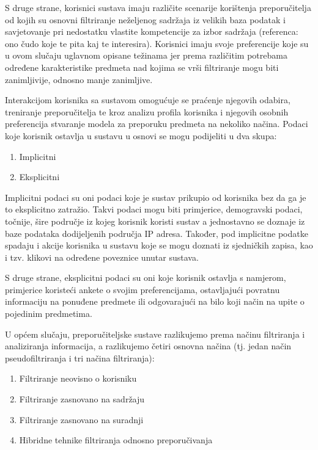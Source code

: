 \documentclass[times, utf8, diplomski, numeric]{fer}
\begin{document}
S druge strane, korisnici sustava imaju različite scenarije korištenja
preporučitelja od kojih su osnovni filtriranje neželjenog sadržaja iz velikih
baza podatak i savjetovanje pri nedostatku vlastite kompetencije za izbor
sadržaja (referenca: ono čudo koje te pita kaj te interesira). Korisnici imaju
svoje preferencije koje su u ovom slučaju uglavnom opisane težinama jer prema
različitim potrebama određene karakteristike predmeta nad kojima se vrši
filtriranje mogu biti zanimljivije, odnosno manje zanimljive.

Interakcijom korisnika sa sustavom omogućuje se praćenje njegovih odabira,
treniranje preporučitelja te kroz analizu profila korisnika i njegovih osobnih
preferencija stvaranje modela za preporuku predmeta na nekoliko načina. Podaci
koje korisnik ostavlja u sustavu u osnovi se mogu podijeliti u dva skupa:
\begin{enumerate}
  \item Implicitni
  \item Eksplicitni
\end{enumerate}
Implicitni podaci su oni podaci koje je sustav prikupio od korisnika bez da ga
je to eksplicitno zatražio. Takvi podaci mogu biti primjerice, demogravski
podaci, točnije, šire područje iz kojeg korisnik koristi sustav a jednostavno se
doznaje iz baze podataka dodijeljenih područja  IP adresa.
Također, pod implicitne podatke spadaju i akcije korisnika u sustavu koje se
mogu doznati iz sjedničkih zapisa, kao i tzv. klikovi na određene poveznice
unutar sustava.

S druge strane, eksplicitni podaci su oni koje korisnik ostavlja s namjerom,
primjerice koristeći ankete o svojim preferencijama, ostavljajući povratnu
informaciju na ponuđene predmete  ili odgovarajući na bilo
koji način na upite o pojedinim predmetima.

U općem slučaju, preporučiteljske sustave razlikujemo prema načinu filtriranja i
analiziranja informacija, a razlikujemo četiri osnovna načina (tj. jedan način
pseudofiltriranja i tri načina filtriranja):
\begin{enumerate}
  \item Filtriranje neovisno o korisniku 
  \item Filtriranje zasnovano na sadržaju 
  \item Filtriranje zasnovano na suradnji 
  \item Hibridne tehnike filtriranja odnosno preporučivanja
\end{enumerate}
\end{document}
